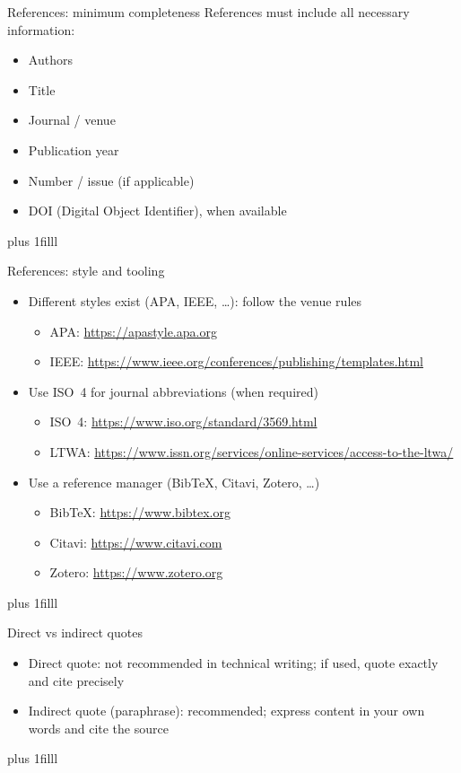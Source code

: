 \documentclass[aspectratio=169]{beamer}
\newcommand{\btVFill}{\vskip0pt plus 1filll}
\begin{document}
\begin{frame}{References: minimum completeness}
  References must include all necessary information:
  \begin{itemize}
    \item Authors
    \item Title
    \item Journal / venue
    \item Publication year
    \item Number / issue (if applicable)
    \item DOI (Digital Object Identifier), when available
  \end{itemize}
  \btVFill
\end{frame}
\begin{frame}{References: style and tooling}
  \begin{itemize}
    \item Different styles exist (APA, IEEE, \ldots): follow the venue rules  
      \begin{itemize}
        \item APA: \url{https://apastyle.apa.org}
        \item IEEE: \url{https://www.ieee.org/conferences/publishing/templates.html}
      \end{itemize}
    \item Use ISO~4 for journal abbreviations (when required)  
      \begin{itemize}
        \item ISO~4: \url{https://www.iso.org/standard/3569.html}
        \item LTWA: \url{https://www.issn.org/services/online-services/access-to-the-ltwa/}
      \end{itemize}
    \item Use a reference manager (Bib\TeX{}, Citavi, Zotero, \ldots)  
      \begin{itemize}
        \item Bib\TeX{}: \url{https://www.bibtex.org}
        \item Citavi: \url{https://www.citavi.com}
        \item Zotero: \url{https://www.zotero.org}
      \end{itemize}
  \end{itemize}
\btVFill
\end{frame}




\begin{frame}{Direct vs indirect quotes}
  \begin{itemize}
    \item Direct quote: not recommended in technical writing; if used, quote exactly and cite precisely
    \item Indirect quote (paraphrase): recommended; express content in your own words and cite the source
  \end{itemize}
\btVFill\end{frame}
\end{document}
